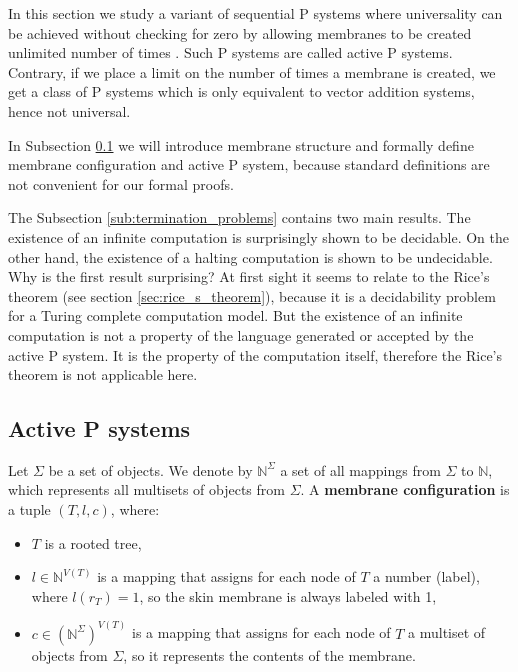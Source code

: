 In this section we study a variant of  sequential P systems where universality can be achieved without checking for zero by allowing membranes to be created unlimited number of times \cite{Ibarra05Active}. Such P systems are called active P systems. Contrary, if we place a limit on the number of times a membrane is created, we get a class of P systems which is only equivalent to vector addition systems, hence not universal.

In Subsection \ref{sub:active_p_systems} we will introduce membrane structure and formally define membrane configuration and active P system, because standard definitions are not convenient for our formal proofs.

The Subsection \ref{sub:termination_problems} contains two main results. The existence of an infinite computation is surprisingly shown to be decidable. On the other hand, the existence of a halting computation is shown to be undecidable. Why is the first result surprising? At first sight it seems to relate to the Rice's theorem (see section \ref{sec:rice_s_theorem}), because it is a decidability problem for a Turing complete computation model. But the existence of an infinite computation is not a property of the language generated or accepted by the active P system. It is the property of the computation itself, therefore the  Rice's theorem is not applicable here.

\subsection{Active P systems} %
\label{sub:active_p_systems}

\begin{definition}
  \label{def:membrane_structure}
  Let $\Sigma$ be a set of objects. We denote by $\mathbb N^\Sigma$ a set of all mappings from $\Sigma$ to $\mathbb N$, which represents all multisets of objects from $\Sigma$. A  {\bf membrane configuration} is a tuple $(T, l, c)$, where:
  \begin{itemize}
    \item $T$ is a rooted tree,
    \item $l\in\mathbb N^{V(T)}$ is a mapping that assigns for each node of $T$ a number (label), where $l(r_T)=1$, so the skin membrane is always labeled with 1,
    \item $c\in(\mathbb N^\Sigma)^{V(T)}$ is a mapping that assigns for each node of $T$ a multiset of objects from $\Sigma$, so it represents the contents of the membrane.
  \end{itemize}
\end{definition}

